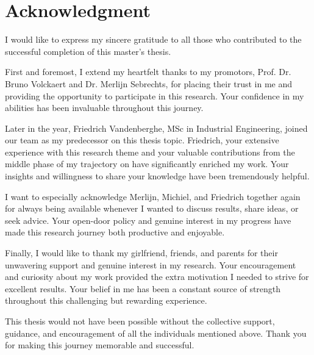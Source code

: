 \chapter*{Acknowledgment}

I would like to express my sincere gratitude to all those who contributed to the successful completion of this master's thesis.

First and foremost, I extend my heartfelt thanks to my promotors, Prof. Dr. Bruno Volckaert and Dr. Merlijn Sebrechts, for placing their trust in me and providing the opportunity to participate in this research. Your confidence in my abilities has been invaluable throughout this journey.

Later in the year, Friedrich Vandenberghe, MSc in Industrial Engineering, joined our team as my predecessor on this thesis topic. Friedrich, your extensive experience with this research theme and your valuable contributions from the middle phase of my trajectory on have significantly enriched my work. Your insights and willingness to share your knowledge have been tremendously helpful.

I want to especially acknowledge Merlijn, Michiel, and Friedrich together again for always being available whenever I wanted to discuss results, share ideas, or seek advice. Your open-door policy and genuine interest in my progress have made this research journey both productive and enjoyable.

Finally, I would like to thank my girlfriend, friends, and parents for their unwavering support and genuine interest in my research. Your encouragement and curiosity about my work provided the extra motivation I needed to strive for excellent results. Your belief in me has been a constant source of strength throughout this challenging but rewarding experience.

This thesis would not have been possible without the collective support, guidance, and encouragement of all the individuals mentioned above. Thank you for making this journey memorable and successful.